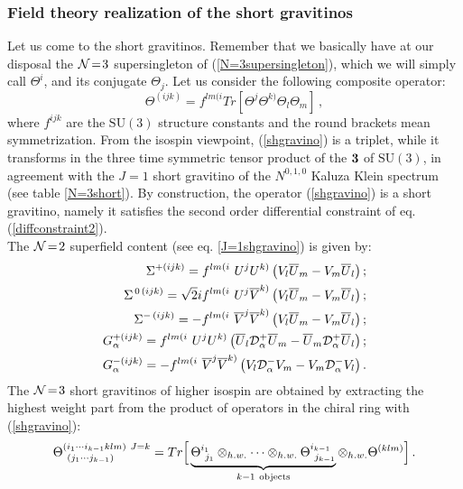 \documentclass[a4paper,12pt]{article}
\def\n010{N^{0,1,0}}
\newcommand{\eqn}[1]{(\ref{#1})}
\begin{document}
\subsubsection{Field theory realization of the short gravitinos}
Let us come to the short gravitinos.
Remember that we basically have at our disposal the ${\cal N}\!=\!3$
supersingleton of (\ref{N=3supersingleton}), which we will simply
call $\Theta^i$, and its conjugate $\Theta_j$.
Let us consider the following composite operator:
\begin{equation}
\Theta^{(ijk)}=f^{lm(i}Tr\left[\Theta^j\Theta^{k)}
\Theta_l\Theta_m\right]\,,\label{shgravino}
\end{equation}
where $f^{ijk}$ are the $\mathrm{SU(3)}$ structure constants and the round
brackets mean symmetrization.
From the isospin viewpoint, \eqn{shgravino} is a triplet, while
it transforms in the three time symmetric tensor
product of the $\bf{3}$ of $\mathrm{SU(3)}$, in agreement with the
$J\!=\!1$ short gravitino of the $\n010$
Kaluza Klein spectrum (see table \ref{N=3short}).
By construction, the operator (\ref{shgravino}) is a short gravitino,
namely it satisfies the second order differential constraint
of eq. (\ref{diffconstraint2}).
\\
The ${\cal N}\!=\!2$ superfield content (see eq. \ref{J=1shgravino})
is given by:
\begin{eqnarray}
\Sigma^{+(ijk)}=f^{lm(i}\ U^j U^{k)}
\left(V_l\overline U_m-V_m\overline U_l\right);\\
\Sigma^{\,0\,(ijk)}=\sqrt 2 if^{lm(i}\ U^j \overline V^{k)}
\left(V_l\overline U_m-V_m\overline U_l\right);\\
\Sigma^{-\,(ijk)}=-f^{lm(i}\ \overline V^j\overline V^{k)}
\left(V_l\overline U_m-V_m\overline U_l\right);\\
G^{+(ijk)}_\alpha=f^{lm(i}\ U^j U^{k)}
\left(\overline U_l {\cal D}_\alpha^+\overline U_m-\overline U_m
{\cal D}_\alpha^+\overline U_l\right);\\
G^{-(ijk)}_\alpha=-f^{lm(i}\ \overline V^j\overline V^{k)}
\left(V_l{\cal D}_\alpha^-V_m-V_m{\cal D}_\alpha^-V_l\right).
\end{eqnarray}
The ${\cal N}\!=\!3$ short gravitinos of higher isospin are
obtained by extracting the highest weight part from
the product of operators in the chiral ring with \eqn{shgravino}:
\begin{equation}
\Theta^{(i_1\cdots i_{k-1}klm)\ J=k}_{\ (j_1\cdots j_{k-1})}=
Tr\Big[\underbrace{\Theta^{i_1}_{\ j_1}\otimes_{h.w.}\cdots
\otimes_{h.w.}\Theta^{i_{k-1}}_{\ j_{k-1}}}_{k-1\ {\rm objects}}
\otimes_{h.w.}\Theta^{(klm)}\Big]\,.
\end{equation}
\end{document}
